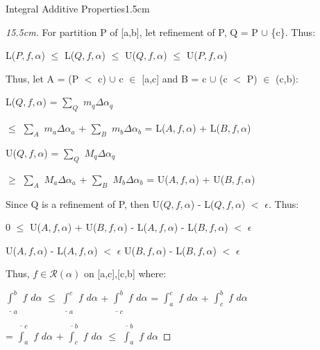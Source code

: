 \begin{ltheorem}{Integral Additive Properties}{1.5cm}
\begin{proof}[15.5cm]
            For partition P of [a,b], let refinement of P, Q = P $\cup$ \{c\}.
            Thus:

            \hspace{0.5cm}
            L($P,f,\alpha$)
            $\leq$ L($Q,f,\alpha$)
            $\leq$ U($Q,f,\alpha$)
            $\leq$ U($P,f,\alpha$)

            Thus, let A = (P $<$ c) $\cup$ c $\in$ [a,c]
            and B = c $\cup$ (c $<$ P) $\in$ (c,b):  

            \hspace{0.5cm}
            L($Q,f,\alpha$)
            = $\sum_Q$ $m_q \Delta \alpha_q$

            \hspace{2.4cm}
            $\leq$ $\sum_A$ $m_a \Delta \alpha_a$ + $\sum_B$ $m_b \Delta \alpha_b$
            = L($A,f,\alpha$) + L($B,f,\alpha$)

            \hspace{0.5cm}
            U($Q,f,\alpha$)
            = $\sum_Q$ $M_q \Delta \alpha_q$

            \hspace{2.4cm}
            $\geq$ $\sum_A$ $M_a \Delta \alpha_a$ + $\sum_B$ $M_b \Delta \alpha_b$
            = U($A,f,\alpha$) + U($B,f,\alpha$)

            Since Q is a refinement of P, then
            U($Q,f,\alpha$) - L($Q,f,\alpha$) $<$ $\epsilon$. Thus:

            \hspace{0.5cm}
            0 $\leq$ U($A,f,\alpha$) + U($B,f,\alpha$)
            - L($A,f,\alpha$) - L($B,f,\alpha$) $<$ $\epsilon$

            \hspace{0.5cm}
            U($A,f,\alpha$) - L($A,f,\alpha$) $<$ $\epsilon$
            \hspace{1cm}
            U($B,f,\alpha$) - L($B,f,\alpha$) $<$ $\epsilon$

            Thus, $f \in \mathscr{R}(\alpha)$ on [a,c],[c,b] where:

            \hspace{0.5cm}
            $\underline{\int}_a^b$ $f$ $d\alpha$
            $\leq$ $\underline{\int}_a^c$ $f$ $d\alpha$
            + $\underline{\int}_c^b$ $f$ $d\alpha$
            = $\int_a^c$ $f$ $d\alpha$ + $\int_c^b$ $f$ $d\alpha$
            
            \hspace{2.1cm}
            = $\overline{\int}_a^c$ $f$ $d\alpha$
            + $\overline{\int}_c^b$ $f$ $d\alpha$
            $\leq$ $\overline{\int}_a^b$ $f$ $d\alpha$


\end{proof}
\end{ltheorem}
